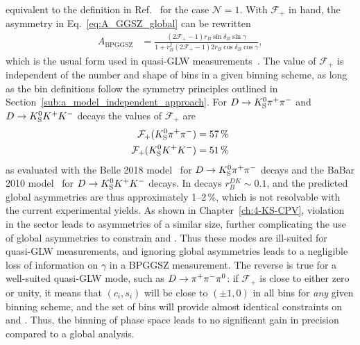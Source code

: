 equivalent to the definition in Ref.~\cite{nayakFirstDeterminationCP2015} for the case $\mathcal N=1$.  With $\mathcal F_+$ in hand, the asymmetry in Eq.~\eqref{eq:A_GGSZ_global} can be rewritten
\begin{align}
    A_\mathrm{BPGGSZ} &= \frac{(2\mathcal F_+-1) r_B \sin \delta_B \sin \gamma}{1 + r_B^2 (2\mathcal F_+-1) 2 r_B \cos \delta_B \cos \gamma},
\end{align}
which is the usual form used in quasi-GLW measurements~\cite{nayakFirstDeterminationCP2015,maldeFirstDeterminationCP2015}. The value of $\mathcal F_+$ is independent of the number and shape of bins in a given binning scheme, as long as the bin definitions follow the symmetry principles outlined in Section~\ref{sub:a_model_independent_approach}. 
For ${{D}\rightarrow{\ensuremath{{K}^0_{\mathrm{S}}}}{\ensuremath{{\pi}^+}}{\ensuremath{{\pi}^-}}}$ and ${D}\rightarrow{\ensuremath{{K}^0_{\mathrm{S}}}}{\ensuremath{{K}^+}}{\ensuremath{{K}^-}}$ decays the values of $\mathcal F_+$ are
\begin{align}
\begin{split}
    \mathcal F_+({{K}^0_{\mathrm{S}}}{{\pi}^+}{{\pi}^-}) = 57\,\% \\
    \mathcal F_+({{K}^0_{\mathrm{S}}}{{K}^+}{{K}^-}) = 51\,\%
\end{split}
\end{align}
as evaluated with the Belle 2018 model~\cite{Belle2018} for ${{D}\rightarrow{\ensuremath{{K}^0_{\mathrm{S}}}}{\ensuremath{{\pi}^+}}{\ensuremath{{\pi}^-}}}$ decays and the BaBar 2010 model~\cite{BABAR2010} for ${D}\rightarrow{\ensuremath{{K}^0_{\mathrm{S}}}}{\ensuremath{{K}^+}}{\ensuremath{{K}^-}}$ decays. In \BtoDK decays $r_B^{DK}\sim 0.1$, and the predicted global asymmetries are thus approximately 1--2\,\%, which is not resolvable with the current experimental yields. As shown in Chapter~\ref{ch:4-KS-CPV}, \CP violation in the \KS sector leads to asymmetries of a similar size, further complicating the use of global asymmetries to constrain \xpm and \ypm. Thus these modes are ill-suited for quasi-GLW measurements, and ignoring global asymmetries leads to a negligible loss of information on $\gamma$ in a BPGGSZ measurement. The reverse is true for a well-suited quasi-GLW mode, such as ${D}\rightarrow{\ensuremath{{\pi}^+}}{\ensuremath{{\pi}^-}}{\ensuremath{{\pi}^0}}$: if $\mathcal F_+$ is close to either zero or unity, it means that $(c_i, s_i)$ will be close to $(\pm1, 0)$ in all bins for \emph{any} given binning scheme, and the set of bins will provide almost identical constraints on \xpm and \ypm. Thus, the binning of phase space leads to no significant gain in precision compared to a global analysis.


